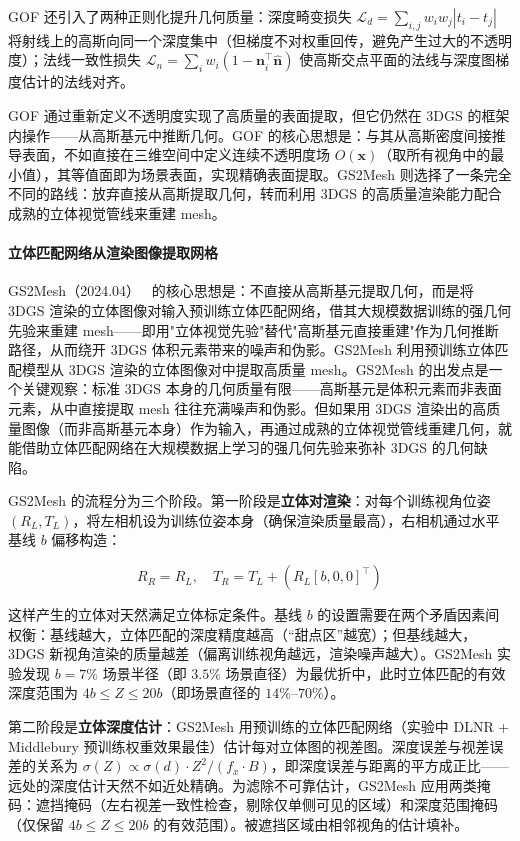 GOF 还引入了两种正则化提升几何质量：深度畸变损失 $\mathcal{L}_d = \sum_{i,j} w_i w_j |t_i - t_j|$ 将射线上的高斯向同一个深度集中（但梯度不对权重回传，避免产生过大的不透明度）；法线一致性损失 $\mathcal{L}_n = \sum_i w_i (1 - \mathbf{n}_i^\top \hat{\mathbf{n}})$ 使高斯交点平面的法线与深度图梯度估计的法线对齐。

GOF 通过重新定义不透明度实现了高质量的表面提取，但它仍然在 3DGS 的框架内操作——从高斯基元中推断几何。GOF 的核心思想是：与其从高斯密度间接推导表面，不如直接在三维空间中定义连续不透明度场 $O(\mathbf{x})$（取所有视角中的最小值），其等值面即为场景表面，实现精确表面提取。GS2Mesh 则选择了一条完全不同的路线：放弃直接从高斯提取几何，转而利用 3DGS 的高质量渲染能力配合成熟的立体视觉管线来重建 mesh。

\paragraph{立体匹配网络从渲染图像提取网格}

GS2Mesh（2024.04）~\cite{2404_01810} 的核心思想是：不直接从高斯基元提取几何，而是将 3DGS 渲染的立体图像对输入预训练立体匹配网络，借其大规模数据训练的强几何先验来重建 mesh——即用"立体视觉先验"替代"高斯基元直接重建"作为几何推断路径，从而绕开 3DGS 体积元素带来的噪声和伪影。GS2Mesh 利用预训练立体匹配模型从 3DGS 渲染的立体图像对中提取高质量 mesh。GS2Mesh 的出发点是一个关键观察：标准 3DGS 本身的几何质量有限——高斯基元是体积元素而非表面元素，从中直接提取 mesh 往往充满噪声和伪影。但如果用 3DGS 渲染出的高质量图像（而非高斯基元本身）作为输入，再通过成熟的立体视觉管线重建几何，就能借助立体匹配网络在大规模数据上学习的强几何先验来弥补 3DGS 的几何缺陷。

GS2Mesh 的流程分为三个阶段。第一阶段是\textbf{立体对渲染}：对每个训练视角位姿 $(R_L, T_L)$，将左相机设为训练位姿本身（确保渲染质量最高），右相机通过水平基线 $b$ 偏移构造：

\begin{equation}
R_R = R_L, \quad T_R = T_L + (R_L [b, 0, 0]^\top)
\end{equation}

这样产生的立体对天然满足立体标定条件。基线 $b$ 的设置需要在两个矛盾因素间权衡：基线越大，立体匹配的深度精度越高（“甜点区”越宽）；但基线越大，3DGS 新视角渲染的质量越差（偏离训练视角越远，渲染噪声越大）。GS2Mesh 实验发现 $b = 7\%$ 场景半径（即 $3.5\%$ 场景直径）为最优折中，此时立体匹配的有效深度范围为 $4b \leq Z \leq 20b$（即场景直径的 $14\%$--$70\%$）。

第二阶段是\textbf{立体深度估计}：GS2Mesh 用预训练的立体匹配网络（实验中 DLNR + Middlebury 预训练权重效果最佳）估计每对立体图的视差图。深度误差与视差误差的关系为 $\sigma(Z) \propto \sigma(d) \cdot Z^2 / (f_x \cdot B)$，即深度误差与距离的平方成正比——远处的深度估计天然不如近处精确。为滤除不可靠估计，GS2Mesh 应用两类掩码：遮挡掩码（左右视差一致性检查，剔除仅单侧可见的区域）和深度范围掩码（仅保留 $4b \leq Z \leq 20b$ 的有效范围）。被遮挡区域由相邻视角的估计填补。

